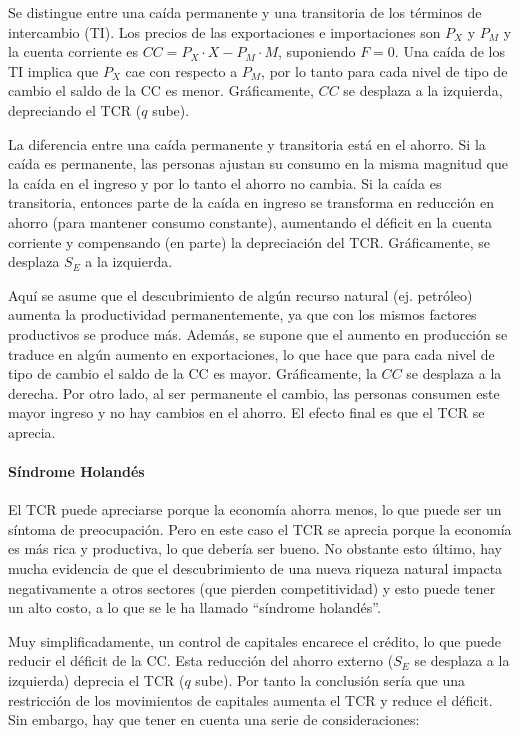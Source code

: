 \documentclass[DeGregorioResumen]{subfiles}
\begin{document}

Se distingue entre una caída permanente y una transitoria de los términos de intercambio (TI). Los precios de las exportaciones e importaciones son $P_X$ y $P_M$ y la cuenta corriente es $CC=P_X\cdot X - P_M\cdot M$, suponiendo $F=0$. Una caída de los TI implica que $P_X$ cae con respecto a $P_M$, por lo tanto para cada nivel de tipo de cambio el saldo de la CC es menor. Gráficamente, $CC$ se desplaza a la izquierda, depreciando el TCR ($q$ sube).

La diferencia entre una caída permanente y transitoria está en el ahorro. Si la caída es permanente, las personas ajustan su consumo en la misma magnitud que la caída en el ingreso y por lo tanto el ahorro no cambia. Si la caída es transitoria, entonces parte de la caída en ingreso se transforma en reducción en ahorro (para mantener consumo constante), aumentando el déficit en la cuenta corriente y compensando (en parte) la depreciación del TCR. Gráficamente, se desplaza $S_E$ a la izquierda.


Aquí se asume que el descubrimiento de algún recurso natural (ej. petróleo) aumenta la productividad permanentemente, ya que con los mismos factores productivos se produce más. Además, se supone que el aumento en producción se traduce en algún aumento en exportaciones, lo que hace que para cada nivel de tipo de cambio el saldo de la CC es mayor. Gráficamente, la $CC$ se desplaza a la derecha. Por otro lado, al ser permanente el cambio, las personas consumen este mayor ingreso y no hay cambios en el ahorro. El efecto final es que el TCR se aprecia.

\paragraph{Síndrome Holandés} El TCR puede apreciarse porque la economía ahorra menos, lo que puede ser un síntoma de preocupación. Pero en este caso el TCR se aprecia porque la economía es más rica y productiva, lo que debería ser bueno. No obstante esto último, hay mucha evidencia de que el descubrimiento de una nueva riqueza natural impacta negativamente a otros sectores (que pierden competitividad) y esto puede tener un alto costo, a lo que se le ha llamado ``síndrome holandés''.


Muy simplificadamente, un control de capitales encarece el crédito, lo que puede reducir el déficit de la CC. Esta reducción del ahorro externo ($S_E$ se desplaza a la izquierda) deprecia el TCR ($q$ sube). Por tanto la conclusión sería que una restricción de los movimientos de capitales aumenta el TCR y reduce el déficit. Sin embargo, hay que tener en cuenta una serie de consideraciones:
\end{document}
